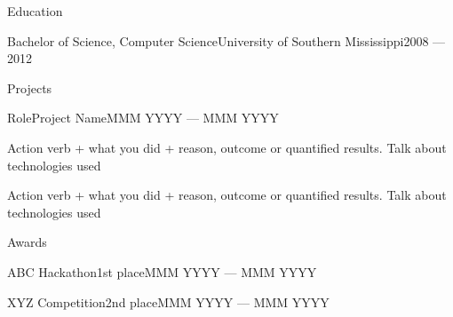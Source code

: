\documentclass{resume} %
\begin{document}

  \begin{rSection}{Education}

      \begin{rEducationItem}{Bachelor of Science, Computer Science}{University of Southern Mississippi}{2008 --- 2012}
      \end{rEducationItem}

  \end{rSection}


  \begin{rSection}{Projects}

      \begin{rWorkHistoryItem}{Role}{Project Name}{MMM YYYY --- MMM YYYY}
          \item Action verb + what you did + reason, outcome or quantified results. Talk about technologies used
          \item Action verb + what you did + reason, outcome or quantified results. Talk about technologies used
      \end{rWorkHistoryItem}

  \end{rSection}


  \begin{rSection}{Awards}

      \begin{rAwardItem}{ABC Hackathon}{1st place}{MMM YYYY --- MMM YYYY}
      \end{rAwardItem}
      \begin{rAwardItem}{XYZ Competition}{2nd place}{MMM YYYY --- MMM YYYY}
      \end{rAwardItem}

  \end{rSection}
\end{document}
